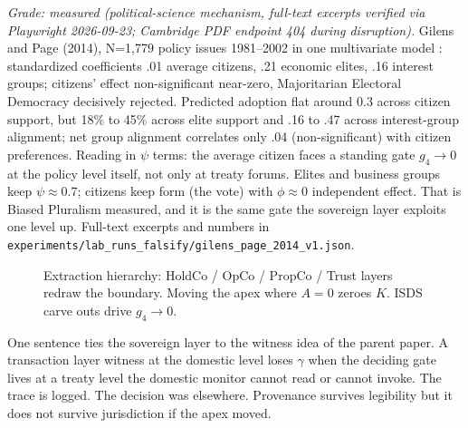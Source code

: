 \documentclass[11pt]{article}
\begin{document}
\textit{Grade: measured (political-science mechanism, full-text excerpts verified via Playwright 2026-09-23; Cambridge PDF endpoint 404 during disruption).} Gilens and Page (2014), N=1,779 policy issues 1981--2002 in one multivariate model \citep{gilens2014}: standardized coefficients .01 average citizens, .21 economic elites, .16 interest groups; citizens' effect non-significant near-zero, Majoritarian Electoral Democracy decisively rejected. Predicted adoption flat around 0.3 across citizen support, but 18\% to 45\% across elite support and .16 to .47 across interest-group alignment; net group alignment correlates only .04 (non-significant) with citizen preferences. Reading in $\psi$ terms: the average citizen faces a standing gate $g_4\to0$ at the policy level itself, not only at treaty forums. Elites and business groups keep $\psi\approx0.7$; citizens keep form (the vote) with $\phi\approx0$ independent effect. That is Biased Pluralism measured, and it is the same gate the sovereign layer exploits one level up. Full-text excerpts and numbers in \texttt{experiments/lab\_runs\_falsify/gilens\_page\_2014\_v1.json}.

\begin{figure}[h]
\centering
{}
\caption{Extraction hierarchy: HoldCo / OpCo / PropCo / Trust layers redraw the boundary. Moving the apex where $A=0$ zeroes $K$. ISDS carve outs drive $g_4\to0$.}
\label{fig:hierarchy}
\end{figure}

One sentence ties the sovereign layer to the witness idea of the parent paper. A transaction layer witness at the domestic level loses $\gamma$ when the deciding gate lives at a treaty level the domestic monitor cannot read or cannot invoke. The trace is logged. The decision was elsewhere. Provenance survives legibility but it does not survive jurisdiction if the apex moved.
\end{document}
